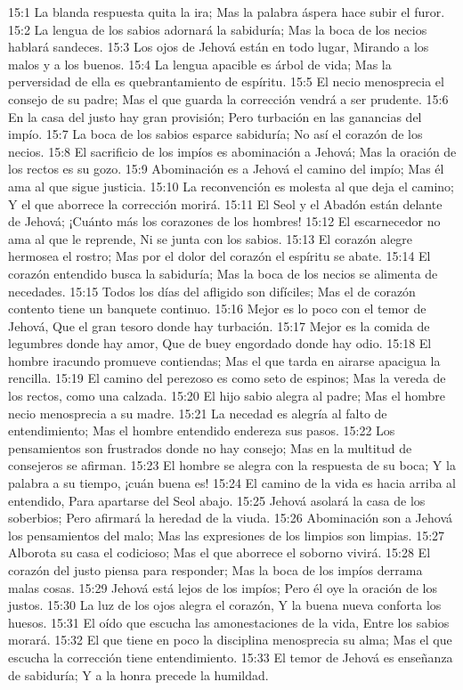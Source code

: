 15:1 La blanda respuesta quita la ira;  
Mas la palabra áspera hace subir el furor.  
15:2 La lengua de los sabios adornará la sabiduría;  
Mas la boca de los necios hablará sandeces.  
15:3 Los ojos de Jehová están en todo lugar,  
Mirando a los malos y a los buenos.  
15:4 La lengua apacible es árbol de vida;  
Mas la perversidad de ella es quebrantamiento de espíritu.  
15:5 El necio menosprecia el consejo de su padre;  
Mas el que guarda la corrección vendrá a ser prudente.  
15:6 En la casa del justo hay gran provisión;  
Pero turbación en las ganancias del impío.  
15:7 La boca de los sabios esparce sabiduría;  
No así el corazón de los necios.  
15:8 El sacrificio de los impíos es abominación a Jehová;  
Mas la oración de los rectos es su gozo.  
15:9 Abominación es a Jehová el camino del impío;  
Mas él ama al que sigue justicia.  
15:10 La reconvención es molesta al que deja el camino;  
Y el que aborrece la corrección morirá.  
15:11 El Seol y el Abadón están delante de Jehová;  
¡Cuánto más los corazones de los hombres!  
15:12 El escarnecedor no ama al que le reprende,  
Ni se junta con los sabios.  
15:13 El corazón alegre hermosea el rostro;  
Mas por el dolor del corazón el espíritu se abate.  
15:14 El corazón entendido busca la sabiduría;  
Mas la boca de los necios se alimenta de necedades.  
15:15 Todos los días del afligido son difíciles;  
Mas el de corazón contento tiene un banquete continuo.  
15:16 Mejor es lo poco con el temor de Jehová,  
Que el gran tesoro donde hay turbación.  
15:17 Mejor es la comida de legumbres donde hay amor,  
Que de buey engordado donde hay odio.  
15:18 El hombre iracundo promueve contiendas;  
Mas el que tarda en airarse apacigua la rencilla.  
15:19 El camino del perezoso es como seto de espinos;  
Mas la vereda de los rectos, como una calzada.  
15:20 El hijo sabio alegra al padre;  
Mas el hombre necio menosprecia a su madre.  
15:21 La necedad es alegría al falto de entendimiento;  
Mas el hombre entendido endereza sus pasos.  
15:22 Los pensamientos son frustrados donde no hay consejo;  
Mas en la multitud de consejeros se afirman.  
15:23 El hombre se alegra con la respuesta de su boca;  
Y la palabra a su tiempo, ¡cuán buena es!  
15:24 El camino de la vida es hacia arriba al entendido,  
Para apartarse del Seol abajo.  
15:25 Jehová asolará la casa de los soberbios;  
Pero afirmará la heredad de la viuda.  
15:26 Abominación son a Jehová los pensamientos del malo;  
Mas las expresiones de los limpios son limpias.  
15:27 Alborota su casa el codicioso;  
Mas el que aborrece el soborno vivirá.  
15:28 El corazón del justo piensa para responder;  
Mas la boca de los impíos derrama malas cosas.  
15:29 Jehová está lejos de los impíos;  
Pero él oye la oración de los justos.  
15:30 La luz de los ojos alegra el corazón,  
Y la buena nueva conforta los huesos.  
15:31 El oído que escucha las amonestaciones de la vida,  
Entre los sabios morará.  
15:32 El que tiene en poco la disciplina menosprecia su alma;  
Mas el que escucha la corrección tiene entendimiento.  
15:33 El temor de Jehová es enseñanza de sabiduría;  
Y a la honra precede la humildad.  

